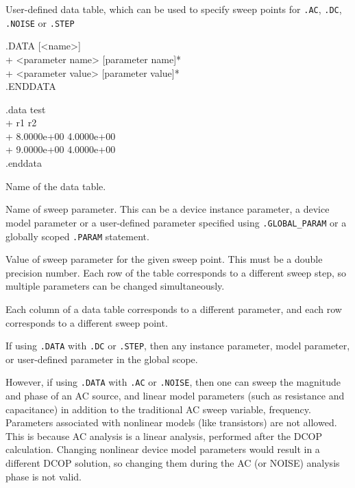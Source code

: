 


User-defined data table, which can be used to specify sweep points for \texttt{.AC}, \texttt{.DC}, \texttt{.NOISE} or \texttt{.STEP}

\begin{Command}

\format
.DATA [<name>] \\
+ <parameter name> [parameter name]* \\
+ <parameter value> [parameter value]* \\
.ENDDATA

\examples
.data test \\
+ r1   r2 \\
+ 8.0000e+00  4.0000e+00 \\
+ 9.0000e+00  4.0000e+00 \\
.enddata

\arguments

\begin{Arguments}
Name of the data table.

Name of sweep parameter.  This can be a device instance parameter, 
  a device model parameter or a user-defined parameter specified using \texttt{.GLOBAL\_PARAM} or a globally scoped \texttt{.PARAM} statement.

Value of sweep parameter for the given sweep point.  This must be a double precision number.  Each row of the table corresponds to a different sweep step, so multiple parameters can be changed simultaneously.

\end{Arguments}

\comments

Each column of a data table corresponds to a different parameter, and each row corresponds to a different sweep point.

If using \texttt{.DATA} with \texttt{.DC} or \texttt{.STEP}, then any instance parameter, model parameter, 
or user-defined parameter in the global scope.

However, if using \texttt{.DATA} with \texttt{.AC} or \texttt{.NOISE}, then one can sweep the magnitude and phase of an AC source, and linear model parameters (such as resistance and capacitance) in addition to the traditional AC sweep variable, frequency.  Parameters associated with nonlinear models (like transistors) are not allowed.  This is because AC analysis is a linear analysis, performed after the DCOP calculation.  Changing nonlinear device model parameters would result in a different DCOP solution, so changing them during the AC (or NOISE) analysis phase is not valid.


\end{Command}
